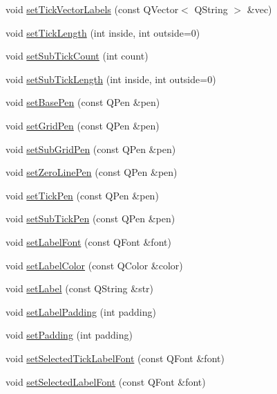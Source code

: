 \begin{DoxyCompactItemize}
\item 
void \hyperlink{classQCPAxis_a921d3ba3853ca3bd2cce3459f7a243ed}{set\-Tick\-Vector\-Labels} (const Q\-Vector$<$ Q\-String $>$ \&vec)
\item 
void \hyperlink{classQCPAxis_a62ec40bebe3540e9c1479a8fd2be3b0d}{set\-Tick\-Length} (int inside, int outside=0)
\item 
void \hyperlink{classQCPAxis_a4b1554ead9d7f9799650d51383e326dd}{set\-Sub\-Tick\-Count} (int count)
\item 
void \hyperlink{classQCPAxis_ab702d6fd42fc620607435339a1c2a2e1}{set\-Sub\-Tick\-Length} (int inside, int outside=0)
\item 
void \hyperlink{classQCPAxis_a778d45fb71b3c7ab3bb7079e18b058e4}{set\-Base\-Pen} (const Q\-Pen \&pen)
\item 
void \hyperlink{classQCPAxis_a70ca642125280be510dc3c2745560591}{set\-Grid\-Pen} (const Q\-Pen \&pen)
\item 
void \hyperlink{classQCPAxis_ad773fa7071b129ef6fa50431ce47816e}{set\-Sub\-Grid\-Pen} (const Q\-Pen \&pen)
\item 
void \hyperlink{classQCPAxis_a533e5aa7fb4981ebc3db761d1e0e38d1}{set\-Zero\-Line\-Pen} (const Q\-Pen \&pen)
\item 
void \hyperlink{classQCPAxis_ad80923bcc1c5da4c4db602c5325e797e}{set\-Tick\-Pen} (const Q\-Pen \&pen)
\item 
void \hyperlink{classQCPAxis_aede4028ae7516bd51a60618a8233f9cf}{set\-Sub\-Tick\-Pen} (const Q\-Pen \&pen)
\item 
void \hyperlink{classQCPAxis_a71ac1a47f7547e490a8c4311d1433cf3}{set\-Label\-Font} (const Q\-Font \&font)
\item 
void \hyperlink{classQCPAxis_a6c906fe56d75f0122335b9f79b999608}{set\-Label\-Color} (const Q\-Color \&color)
\item 
void \hyperlink{classQCPAxis_a33bcc382c111c9f31bb0687352a2dea4}{set\-Label} (const Q\-String \&str)
\item 
void \hyperlink{classQCPAxis_a4391192a766e5d20cfe5cbc17607a7a2}{set\-Label\-Padding} (int padding)
\item 
void \hyperlink{classQCPAxis_a5691441cb3de9e9844855d339c0db279}{set\-Padding} (int padding)
\item 
void \hyperlink{classQCPAxis_a845ccb560b7bc5281098a5be494145f6}{set\-Selected\-Tick\-Label\-Font} (const Q\-Font \&font)
\item 
void \hyperlink{classQCPAxis_a02ec2a75d4d8401eaab834fbc6803d30}{set\-Selected\-Label\-Font} (const Q\-Font \&font)

\end{DoxyCompactItemize}
